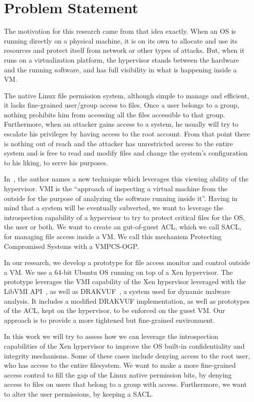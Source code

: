 \section{Problem Statement}\label{sec:problem} The motivation for this research came from that idea exactly. When an \ac{OS} is running directly on a physical machine, it is on its own to allocate and use its resources and protect itself from network or other types of attacks. But, when it runs on a virtualization platform, the hypervisor stands between the hardware and the running software, and has full visibility in what is happening inside a \ac{VM}. 
\par The native Linux file permission system, although simple to manage and efficient, it lacks fine-grained user/group access to files. Once a user belongs to a group, nothing prohibits him from accessing all the files accessible to that group. Furthermore, when an attacker gains access to a system, he usually will try to escalate his privileges by having access to the root account. From that point there is nothing out of reach and the attacker has unrestricted access to the entire system and is free to read and modify files and change the system's configuration to his liking, to serve his purposes.
\par In~\cite{garfinkel2003virtual}, the author names a new technique which leverages this viewing ability of the hypervisor. \ac{VMI} is the “approach of inspecting a virtual machine from the outside for the purpose of analyzing the software running inside it”. Having in mind that a system will be eventually subverted, we want to leverage the introspection capability of a hypervisor to try to protect critical files for the OS, the user or both. We want to create an gut-of-guest \ac{ACL}, which we call \ac{SACL}, for managing file access inside a VM. We call this mechanism Protecting Compromised Systems with a \ac{VMPCS-OGP}.
\par In our research, we develop a prototype for file access monitor and control outside a \ac{VM}. We use a 64-bit Ubuntu OS running on top of a Xen hypervisor. The prototype leverages the \ac{VMI} capability of the Xen hypervisor leveraged with the LibVMI \ac{API}~\cite{payne2011libvmi}, as well as DRAKVUF~\cite{lengyel2014drakvuf}, a system used for dynamic malware analysis. It includes a modified DRAKVUF implementation, as well as prototypes of the \ac{ACL}, kept on the hypervisor, to be enforced on the guest \ac{VM}. Our approach is to provide a more tightened but fine-grained environment.
\par In this work we will try to assess how we can leverage the introspection capabilities of the Xen hypervisor to improve the \ac{OS} built-in confidentiality and integrity mechanisms. Some of these cases include denying access to the root user, who has access to the entire filesystem. We want to make a more fine-grained access control to fill the gap of the Linux native permission bits, by denying access to files on users that belong to a group with access. Furthermore, we want to alter the user permissions, by keeping a \ac{SACL}. 

